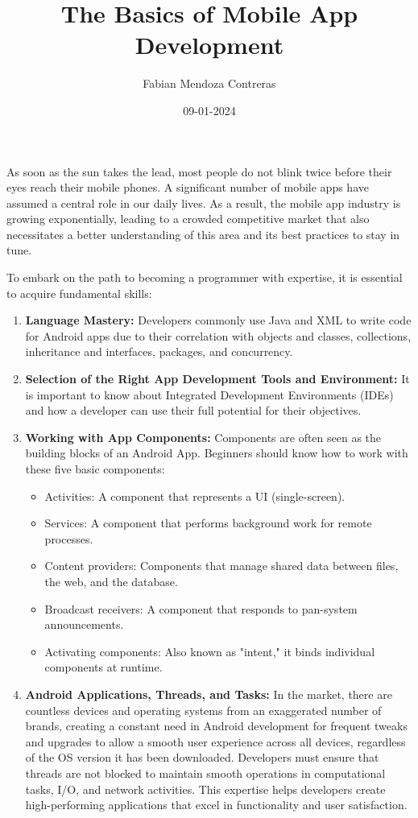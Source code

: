 \documentclass{article}
\title{The Basics of Mobile App Development}
\author{Fabian Mendoza Contreras}
\date{09-01-2024}
\begin{document}
	
	\maketitle
	
	As soon as the sun takes the lead, most people do not blink twice before their eyes reach their mobile phones. A significant number of mobile apps have assumed a central role in our daily lives. As a result, the mobile app industry is growing exponentially, leading to a crowded competitive market that also necessitates a better understanding of this area and its best practices to stay in tune.
	
	To embark on the path to becoming a programmer with expertise, it is essential to acquire fundamental skills:
	
	\begin{enumerate}
		\item \textbf{Language Mastery:} Developers commonly use Java and XML to write code for Android apps due to their correlation with objects and classes, collections, inheritance and interfaces, packages, and concurrency.
		
		\item \textbf{Selection of the Right App Development Tools and Environment:} It is important to know about Integrated Development Environments (IDEs) and how a developer can use their full potential for their objectives.
		
		\item \textbf{Working with App Components:} Components are often seen as the building blocks of an Android App. Beginners should know how to work with these five basic components:
		\begin{itemize}
			\item Activities: A component that represents a UI (single-screen).
			\item Services: A component that performs background work for remote processes.
			\item Content providers: Components that manage shared data between files, the web, and the database.
			\item Broadcast receivers: A component that responds to pan-system announcements.
			\item Activating components: Also known as "intent," it binds individual components at runtime.
		\end{itemize}
		
		\item \textbf{Android Applications, Threads, and Tasks:} In the market, there are countless devices and operating systems from an exaggerated number of brands, creating a constant need in Android development for frequent tweaks and upgrades to allow a smooth user experience across all devices, regardless of the OS version it has been downloaded. Developers must ensure that threads are not blocked to maintain smooth operations in computational tasks, I/O, and network activities. This expertise helps developers create high-performing applications that excel in functionality and user satisfaction.
	\end{enumerate}
	
\end{document}
